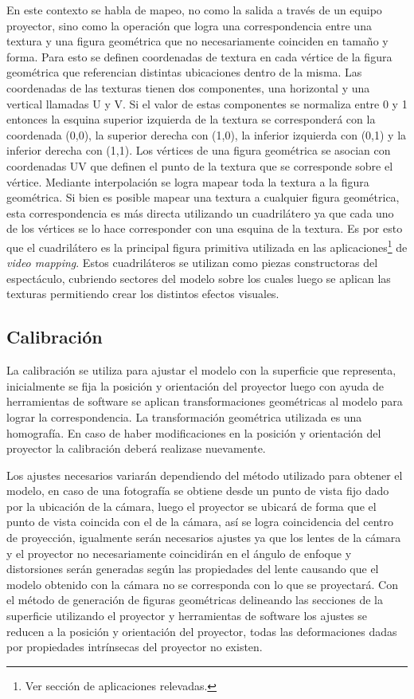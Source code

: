 En este contexto se habla de mapeo, no como la salida a través de un equipo proyector, sino como la operación que logra una correspondencia entre una textura y una figura geométrica que no necesariamente coinciden en tamaño y forma. Para esto se definen coordenadas de textura en cada vértice de la figura geométrica que referencian distintas ubicaciones dentro de la misma.
Las coordenadas de las texturas tienen dos componentes, una horizontal y una vertical llamadas U y V. Si el valor de estas componentes se normaliza entre 0 y 1 entonces la esquina superior izquierda de la textura se corresponderá con la coordenada (0,0), la superior derecha con (1,0), la inferior izquierda con (0,1) y la inferior derecha con (1,1).
Los vértices de una figura geométrica se asocian con coordenadas UV que definen el punto de la textura que se corresponde sobre el vértice. Mediante interpolación se logra mapear toda la textura a la figura geométrica.
Si bien es posible mapear una textura a cualquier figura geométrica, esta correspondencia es más directa utilizando un cuadrilátero ya que cada uno de los vértices se lo hace corresponder con una esquina de la textura. Es por esto que el cuadrilátero es la principal figura primitiva utilizada en las aplicaciones\footnote{Ver sección de aplicaciones relevadas.} de \emph{video mapping}.
Estos cuadriláteros se utilizan como piezas constructoras del espectáculo, cubriendo sectores del modelo sobre los cuales luego se aplican las texturas permitiendo crear los distintos efectos visuales.
\subsection{Calibración}
La calibración se utiliza para ajustar el modelo con la superficie que representa, inicialmente se fija la posición y orientación del proyector luego con ayuda de herramientas de software se aplican transformaciones geométricas al modelo para lograr la correspondencia. La transformación geométrica utilizada es una homografía\cite{LibroCompGrafica3}.
En caso de haber modificaciones en la posición y orientación del proyector la calibración deberá realizase nuevamente.

Los ajustes necesarios variarán dependiendo del método utilizado para obtener el modelo, en caso de una fotografía se obtiene desde un punto de vista fijo dado por la ubicación de la cámara, luego el proyector se ubicará de forma que el punto de vista coincida con el de la cámara, así se logra coincidencia del centro de proyección, igualmente serán necesarios ajustes ya que los lentes de la cámara y el proyector no necesariamente coincidirán en el ángulo de enfoque y distorsiones serán generadas según las propiedades del lente causando que el modelo obtenido con la cámara no se corresponda con lo que se proyectará\cite{LibroCompGrafica2}\cite{LibroPhotographicOptics}.
Con el método de generación de figuras geométricas delineando las secciones de la superficie utilizando el proyector y herramientas de software los ajustes se reducen a la posición y orientación del proyector, todas las deformaciones dadas por propiedades intrínsecas del proyector no existen.

